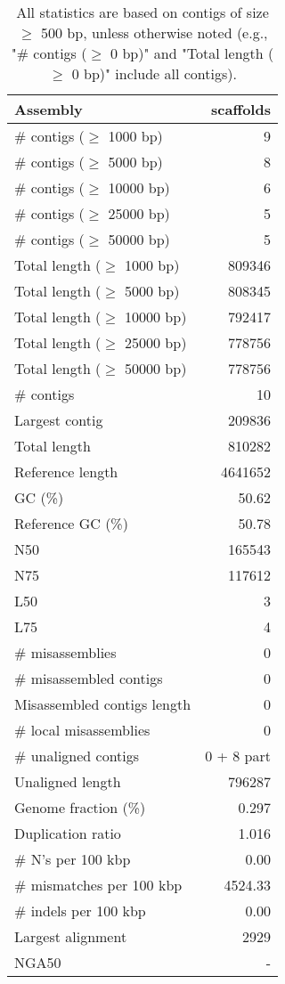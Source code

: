 \documentclass[12pt,a4paper]{article}
\begin{document}
\begin{table}[ht]
\begin{center}
\caption{All statistics are based on contigs of size $\geq$ 500 bp, unless otherwise noted (e.g., "\# contigs ($\geq$ 0 bp)" and "Total length ($\geq$ 0 bp)" include all contigs).}
\begin{tabular}{|l*{1}{|r}|}
\hline
Assembly & scaffolds \\ \hline
\# contigs ($\geq$ 1000 bp) & 9 \\ \hline
\# contigs ($\geq$ 5000 bp) & 8 \\ \hline
\# contigs ($\geq$ 10000 bp) & 6 \\ \hline
\# contigs ($\geq$ 25000 bp) & 5 \\ \hline
\# contigs ($\geq$ 50000 bp) & 5 \\ \hline
Total length ($\geq$ 1000 bp) & 809346 \\ \hline
Total length ($\geq$ 5000 bp) & 808345 \\ \hline
Total length ($\geq$ 10000 bp) & 792417 \\ \hline
Total length ($\geq$ 25000 bp) & 778756 \\ \hline
Total length ($\geq$ 50000 bp) & 778756 \\ \hline
\# contigs & 10 \\ \hline
Largest contig & 209836 \\ \hline
Total length & 810282 \\ \hline
Reference length & 4641652 \\ \hline
GC (\%) & 50.62 \\ \hline
Reference GC (\%) & 50.78 \\ \hline
N50 & 165543 \\ \hline
N75 & 117612 \\ \hline
L50 & 3 \\ \hline
L75 & 4 \\ \hline
\# misassemblies & 0 \\ \hline
\# misassembled contigs & 0 \\ \hline
Misassembled contigs length & 0 \\ \hline
\# local misassemblies & 0 \\ \hline
\# unaligned contigs & 0 + 8 part \\ \hline
Unaligned length & 796287 \\ \hline
Genome fraction (\%) & 0.297 \\ \hline
Duplication ratio & 1.016 \\ \hline
\# N's per 100 kbp & 0.00 \\ \hline
\# mismatches per 100 kbp & 4524.33 \\ \hline
\# indels per 100 kbp & 0.00 \\ \hline
Largest alignment & 2929 \\ \hline
NGA50 & - \\ \hline
\end{tabular}
\end{center}
\end{table}
\end{document}
